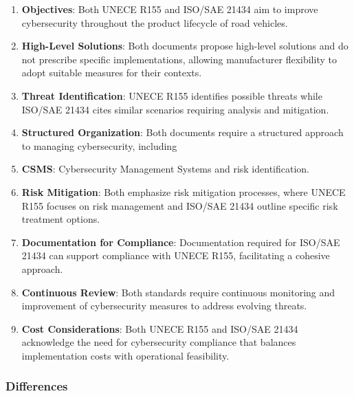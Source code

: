 \begin{enumerate}
    \item \textbf{Objectives}: Both UNECE R155 and ISO/SAE 21434 aim to improve cybersecurity throughout the product lifecycle of road vehicles.
    \item \textbf{High-Level Solutions}: Both documents propose high-level solutions and do not prescribe specific implementations, allowing manufacturer flexibility to adopt suitable measures for their contexts.
    \item \textbf{Threat Identification}: UNECE R155 identifies possible threats while ISO/SAE 21434 cites similar scenarios requiring analysis and mitigation.
    \item \textbf{Structured Organization}: Both documents require a structured approach to managing cybersecurity, including
    \item \textbf{CSMS}: Cybersecurity Management Systems and risk identification.
    \item \textbf{Risk Mitigation}: Both emphasize risk mitigation processes, where UNECE R155 focuses on risk management and ISO/SAE 21434 outline specific risk treatment options.
    \item \textbf{Documentation for Compliance}: Documentation required for ISO/SAE 21434 can support compliance with UNECE R155, facilitating a cohesive approach.
    \item \textbf{Continuous Review}: Both standards require continuous monitoring and improvement of cybersecurity measures to address evolving threats.
    \item \textbf{Cost Considerations}: Both UNECE R155 and ISO/SAE 21434 acknowledge the need for cybersecurity compliance that balances implementation costs with operational feasibility.
\end{enumerate}

\subsubsection{Differences}

